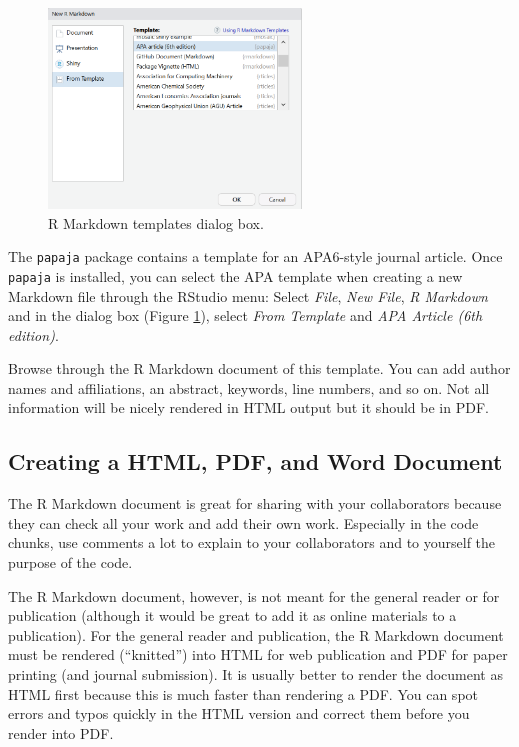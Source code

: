 \documentclass[doc,floatsintext]{apa6}
\begin{document}
\begin{figure}
\includegraphics[width=2.65in]{template} \caption{R Markdown templates dialog box.}\label{fig:template}
\end{figure}

The \texttt{papaja} package contains a template for an APA6-style
journal article. Once \texttt{papaja} is installed, you can select the
APA template when creating a new Markdown file through the RStudio menu:
Select \emph{File}, \emph{New File}, \emph{R Markdown} and in the dialog
box (Figure \ref{fig:template}), select \emph{From Template} and
\emph{APA Article (6th edition)}.

Browse through the R Markdown document of this template. You can add
author names and affiliations, an abstract, keywords, line numbers, and
so on. Not all information will be nicely rendered in HTML output but it
should be in PDF.

\subsection{Creating a HTML, PDF, and Word
Document}\label{creating-a-html-pdf-and-word-document}

The R Markdown document is great for sharing with your collaborators
because they can check all your work and add their own work. Especially
in the code chunks, use comments a lot to explain to your collaborators
and to yourself the purpose of the code.

The R Markdown document, however, is not meant for the general reader or
for publication (although it would be great to add it as online
materials to a publication). For the general reader and publication, the
R Markdown document must be rendered (\enquote{knitted}) into HTML for
web publication and PDF for paper printing (and journal submission). It
is usually better to render the document as HTML first because this is
much faster than rendering a PDF. You can spot errors and typos quickly
in the HTML version and correct them before you render into PDF.
\end{document}
